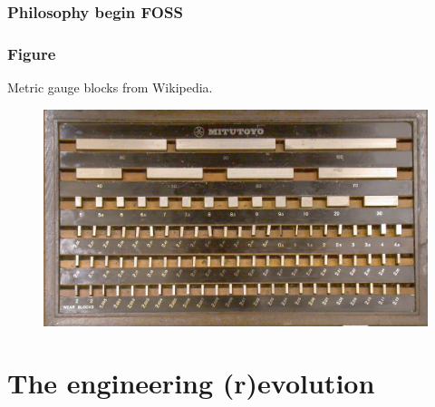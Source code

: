 \documentclass{beamer}
\begin{document}
\begin{frame}
\frametitle{Philosophy begin FOSS}



\end{frame}

\begin{frame}
\frametitle{Figure}
Metric gauge blocks from Wikipedia.
\begin{figure}
\includegraphics[width=0.8\linewidth]{Pictures/GaugeBlockMetricSet.jpg}
\end{figure}
\end{frame}


\section{The engineering (r)evolution}
\end{document}
